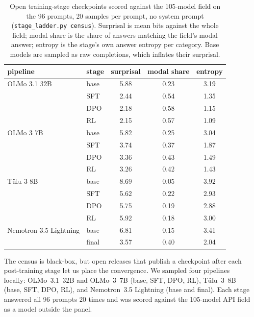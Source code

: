 \documentclass[11pt]{article}
\begin{document}
\begin{table}[t]
\centering
\small
\caption{Open training-stage checkpoints scored against the 105-model field on the 96 prompts, 20 samples per prompt, no system prompt (\texttt{stage\_ladder.py census}). Surprisal is mean bits against the whole field; modal share is the share of answers matching the field's modal answer; entropy is the stage's own answer entropy per category. Base models are sampled as raw completions, which inflates their surprisal.}
\label{tab:stages}
\begin{tabular}{llccc}
\toprule
pipeline & stage & surprisal & modal share & entropy \\
\midrule
OLMo 3.1 32B & base & 5.88 & 0.23 & 3.19 \\
 & SFT & 2.44 & 0.54 & 1.35 \\
 & DPO & 2.18 & 0.58 & 1.15 \\
 & RL & 2.15 & 0.57 & 1.09 \\
\midrule
OLMo 3 7B & base & 5.82 & 0.25 & 3.04 \\
 & SFT & 3.74 & 0.37 & 1.87 \\
 & DPO & 3.36 & 0.43 & 1.49 \\
 & RL & 3.26 & 0.42 & 1.43 \\
\midrule
Tülu 3 8B & base & 8.69 & 0.05 & 3.92 \\
 & SFT & 5.62 & 0.22 & 2.93 \\
 & DPO & 5.75 & 0.19 & 2.88 \\
 & RL & 5.92 & 0.18 & 3.00 \\
\midrule
Nemotron 3.5 Lightning & base & 6.81 & 0.15 & 3.41 \\
 & final & 3.57 & 0.40 & 2.04 \\
\bottomrule
\end{tabular}
\end{table}

The census is black-box, but open releases that publish a checkpoint after each post-training stage let us place the convergence. We sampled four pipelines locally: OLMo~3.1~32B and OLMo~3~7B (base, SFT, DPO, RL), Tülu~3~8B (base, SFT, DPO, RL), and Nemotron~3.5 Lightning (base and final). Each stage answered all 96 prompts 20 times and was scored against the 105-model API field as a model outside the panel.
\end{document}
